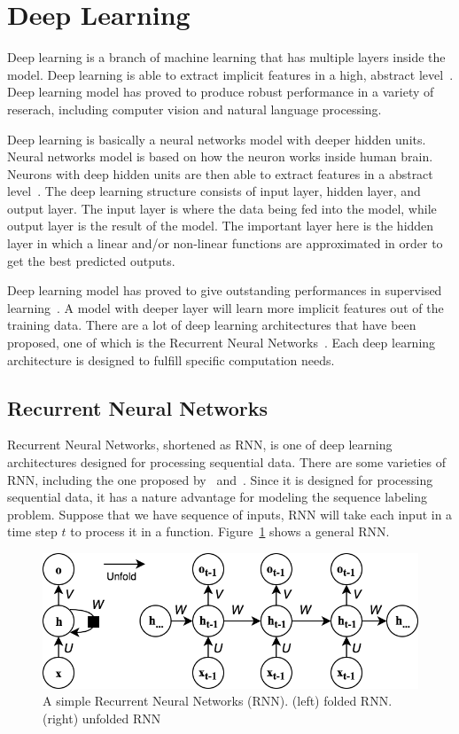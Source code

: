 \section{Deep Learning}
Deep learning is a branch of machine learning that has multiple layers inside the model. Deep learning is able to extract implicit features in a high, abstract level~\citep{lecun2015deep}. Deep learning model has proved to produce robust performance in a variety of reserach, including computer vision and natural language processing.

Deep learning is basically a neural networks model with deeper hidden units. Neural networks model is based on how the neuron works inside human brain. Neurons with deep hidden units are then able to extract features in a abstract level~\citep{bengio2007scaling}. The deep learning structure consists of input layer, hidden layer, and output layer. The input layer is where the data being fed into the model, while output layer is the result of the model. The important layer here is the hidden layer in which a linear and/or non-linear functions are approximated in order to get the best predicted outputs.

Deep learning model has proved to give outstanding performances in supervised learning~\citep{Goodfellow-et-al-2016-Book}. A model with deeper layer will learn more implicit features out of the training data. There are a lot of deep learning architectures that have been proposed, one of which is the Recurrent Neural Networks~\citep{elman1990finding}. Each deep learning architecture is designed to fulfill specific computation needs.

\subsection{Recurrent Neural Networks}
Recurrent Neural Networks, shortened as RNN, is one of deep learning architectures designed for processing sequential data. There are some varieties of RNN, including the one proposed by~\cite{elman1990finding} and~\cite{jordan1986attractor}. Since it is designed for processing sequential data, it has a nature advantage for modeling the sequence labeling problem. Suppose that we have sequence of inputs, RNN will take each input in a time step $t$ to process it in a function. Figure~\ref{fig:simplernn} shows a general RNN.

\begin{figure}
	\centering
	\includegraphics[width=0.80\linewidth]{images/RNNNew}
	\caption{A simple Recurrent Neural Networks (RNN). (left) folded RNN. (right) unfolded RNN}
	\label{fig:simplernn}
\end{figure}

